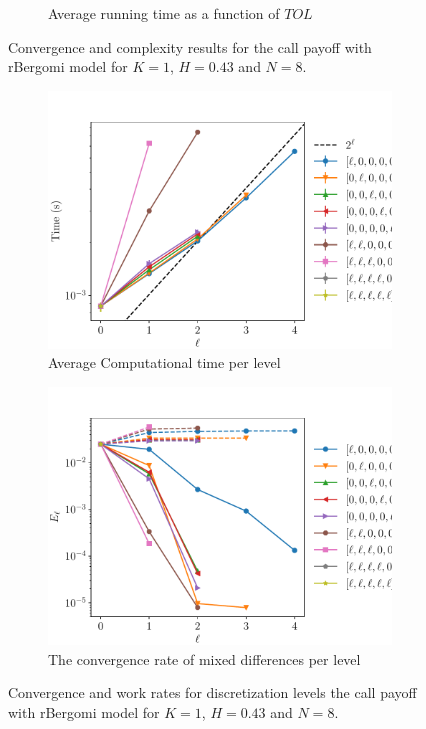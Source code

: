 \documentclass[11pt]{article}
\begin{document}
\begin{figure}[!h]
\begin{subfigure}{.4\textwidth}
		\caption{Average running time as a function of $TOL$}
		\label{fig:misc_rbergomi_8_steps_sub2}
	\end{subfigure}%
	\caption{Convergence and complexity results for the call payoff with rBergomi model for $K=1$, $H=0.43$ and $N=8$.}
	\label{fig:misc_rbergomi_8_steps_1}
\end{figure}



\begin{figure}[!h]
	\centering
	\begin{subfigure}{.4\textwidth}
		\centering
		\includegraphics[width=0.95\linewidth]{./figures/bergomi_misc/H_043/N_8/level_work.pdf}
		\caption{Average Computational time per level}
		\label{fig:misc_rbergomi_8_steps_sub3}
	\end{subfigure}%
	\begin{subfigure}{.4\textwidth}
		\centering
		\includegraphics[width=0.95\linewidth]{./figures/bergomi_misc/H_043/N_8/levels_error_rate.pdf}
		\caption{  The convergence rate of mixed differences per level}
		\label{fig:misc_rbergomi_8_steps_sub4}
	\end{subfigure}%
	\caption{Convergence and work rates for discretization levels  the call payoff with rBergomi model for $K=1$, $H=0.43$ and $N=8$.}
	\label{fig:misc_rbergomi_8_steps_2}
\end{figure}
\end{document}
